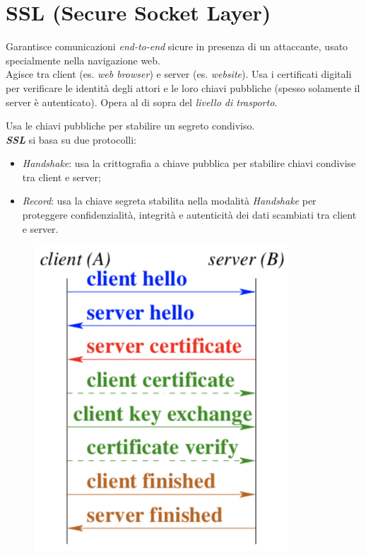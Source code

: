 \documentclass[11pt, a4paper, twoside, italian]{report}
\theoremstyle{plain}
\begin{document}
\section*{SSL (Secure Socket Layer)}
Garantisce comunicazioni \textit{end-to-end} sicure in presenza di un attaccante, usato specialmente nella navigazione web.\\
Agisce tra client (es. \textit{web browser}) e server (es. \textit{website}). Usa i certificati digitali per verificare le identità degli attori e le loro chiavi pubbliche (spesso solamente il server è autenticato). Opera al di sopra del \textit{livello di trasporto}.
\begin{multicols}{2}
	\noindent
	Usa le chiavi pubbliche per stabilire un segreto condiviso.\\
	\textit{\textbf{SSL}} si basa su due protocolli:
	\begin{itemize}
		\item \textit{Handshake}: usa la crittografia a chiave pubblica per stabilire chiavi condivise tra client e server;
		\item \textit{Record}: usa la chiave segreta stabilita nella modalità \textit{Handshake} per proteggere confidenzialità, integrità e autenticità dei dati scambiati tra client e server.
	\end{itemize}
\columnbreak
	\begin{figure}[H]
		\centering
		\includegraphics[scale=0.6]{sslrecap}
	\end{figure}
\end{multicols}
\end{document}
